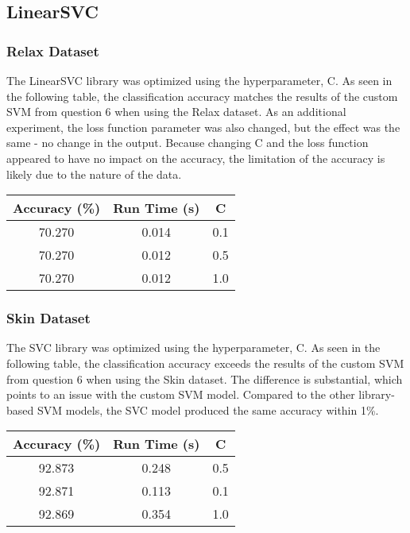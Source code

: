 \documentclass[letterpaper]{article}
\begin{document}
\subsection{LinearSVC}
\subsubsection{Relax Dataset}
The LinearSVC library was optimized using the hyperparameter, C. As seen in the following table, the classification accuracy matches the results of the custom SVM from question 6 when using the Relax dataset. As an additional experiment, the loss function parameter was also changed, but the effect was the same - no change in the output. Because changing C and the loss function appeared to have no impact on the accuracy, the limitation of the accuracy is likely due to the nature of the data.
\begin{center}
\begin{tabular}{|c c c|} 
 \hline
 Accuracy (\%) & Run Time (s) & C \\
 \hline
 70.270 & 0.014 & 0.1 \\
 \hline
 70.270 & 0.012 & 0.5 \\
 \hline
 70.270 & 0.012 & 1.0 \\
 \hline
\end{tabular}
\end{center}

\subsubsection{Skin Dataset}
The SVC library was optimized using the hyperparameter, C. As seen in the following table, the classification accuracy exceeds the results of the custom SVM from question 6 when using the Skin dataset. The difference is substantial, which points to an issue with the custom SVM model. Compared to the other library-based SVM models, the SVC model produced the same accuracy within 1\%. 
\begin{center}
\begin{tabular}{|c c c|} 
 \hline
 Accuracy (\%) & Run Time (s) & C \\
 \hline
 92.873 & 0.248 & 0.5 \\
 \hline
 92.871 & 0.113 & 0.1 \\
 \hline
 92.869 & 0.354 & 1.0 \\
 \hline
\end{tabular}
\end{center}
\end{document}
